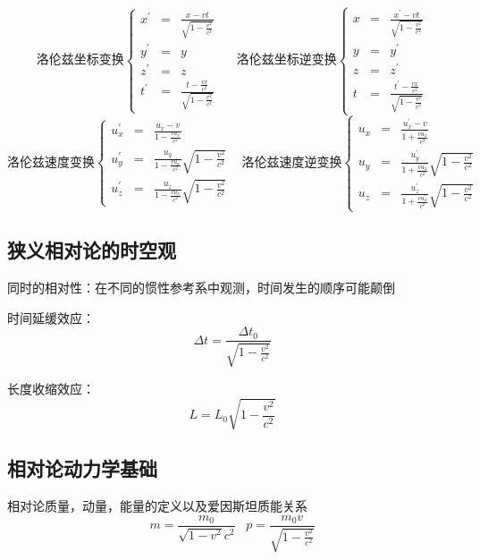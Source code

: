 \documentclass[UTF8]{article}
\begin{document}
\[ \mbox{洛伦兹坐标变换}\left\{
\begin{aligned}
x^{'} & = & \frac{x - vt}{\sqrt{1 - \frac{v^2}{c^2}}} \\
y^{'} & = & y \\
z^{'} & = & z \\
t^{'} & = & \frac{t - \frac{vx}{c^2}}{\sqrt{1 - \frac{v^2}{c^2}}}
\end{aligned}
\right.
\;\;\;\;\;
\mbox{洛伦兹坐标逆变换}\left\{
\begin{aligned}
x & = & \frac{x^{'} - vt}{\sqrt{1 - \frac{v^2}{c^2}}} \\
y & = & y^{'} \\
z & = & z^{'} \\
t & = & \frac{t^{'} - \frac{vx}{c^2}}{\sqrt{1 - \frac{v^2}{c^2}}}
\end{aligned}
\right.
\]
\[ \mbox{洛伦兹速度变换}\left\{
\begin{aligned}
u^{'}_x & = & \frac{u_x - v}{1 - \frac{vu_x}{c^2}} \\
u^{'}_y & = & \frac{u_y}{1 - \frac{vu_x}{c^2}}\sqrt{1 - \frac{v^2}{c^2}} \\
u^{'}_z & = & \frac{u_z}{1 - \frac{vu_x}{c^2}}\sqrt{1 - \frac{v^2}{c^2}}
\end{aligned}
\right.
\;\;\;
\mbox{洛伦兹速度逆变换}\left\{
\begin{aligned}
u_x & = & \frac{u^{'}_x - v}{1 + \frac{vu^{'}_x}{c^2}} \\
u_y & = & \frac{u^{'}_y}{1 + \frac{vu^{'}_x}{c^2}}\sqrt{1 - \frac{v^2}{c^2}} \\
u_z & = & \frac{u^{'}_z}{1 + \frac{vu^{'}_x}{c^2}}\sqrt{1 - \frac{v^2}{c^2}}
\end{aligned}
\right.
\]

\subsection{狭义相对论的时空观}

    同时的相对性：在不同的惯性参考系中观测，时间发生的顺序可能颠倒

    时间延缓效应：
    \[\Delta t = \frac{\Delta t_0}{\sqrt{1 - \frac{v^2}{c^2}}}\]

    长度收缩效应：
    \[L = L_0\sqrt{1 - \frac{v^2}{c^2}}\]

\subsection{相对论动力学基础}

    相对论质量，动量，能量的定义以及爱因斯坦质能关系
    \[m = \frac{m_0}{\sqrt{1 - v^2}c^2}\;\;\;p = \frac{m_0v}{\sqrt{1 - \frac{v^2}{c^2}}}\]
\end{document}
